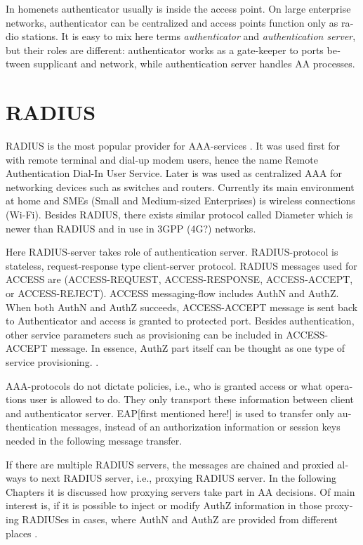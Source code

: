 \documentclass[12pt,a4paper,english]{tutthesis}
\begin{document}
\begin{otherlanguage}{english}
In homenets authenticator usually is inside the access point.
On large enterprise networks, authenticator can be centralized 
and access points function only as radio stations.
It is easy to mix here terms \emph{authenticator} and \emph{authentication
server}, but their roles are different: authenticator works as a
gate-keeper to ports between supplicant and network, while
authentication server handles AA processes.

\section{RADIUS}
\label{sec-2-2}
\label{sec:radius}
RADIUS is the most popular provider for
AAA-services \cite[p.75]{radius-popular}.  It was used first for
with remote terminal and dial-up modem users, hence the name Remote
Authentication Dial-In User Service. Later is was used as centralized AAA
for networking devices such as switches and routers.  Currently its
main environment at home and SMEs (Small and Medium-sized Enterprises) is
wireless connections (Wi-Fi).  Besides RADIUS, there exists similar protocol
called Diameter which is newer than RADIUS and in use in 3GPP (4G?)
networks. 

Here RADIUS-server takes role of authentication server.
RADIUS-protocol is stateless, request-response type client-server
protocol.  RADIUS messages used for ACCESS are (ACCESS-REQUEST,
ACCESS-RESPONSE, ACCESS-ACCEPT, or ACCESS-REJECT). ACCESS
messaging-flow includes AuthN and AuthZ. When both AuthN and AuthZ
succeeds, ACCESS-ACCEPT message is sent back to Authenticator and
access is granted to protected port.  Besides authentication, other
service parameters such as provisioning can be included in
ACCESS-ACCEPT message. In essence, AuthZ part itself can be thought as
one type of service provisioning. \cite{rfc5608}.




AAA-protocols do not dictate policies, i.e., who is granted access or
what operations user is allowed to do. They only transport these information
between client and authenticator server.
EAP[first mentioned here!] is used to transfer only authentication
messages, instead of an authorization information or session keys needed
in the following message transfer. 

If there are multiple RADIUS servers, the messages are chained and
proxied always to next RADIUS server, i.e.,   proxying RADIUS server.
In the following Chapters it is discussed how proxying servers take 
part in AA decisions. Of main interest is, if it is possible 
to inject or modify AuthZ information in those proxying RADIUSes in cases, 
where AuthN and AuthZ are provided from different
places \cite{rfc2607}.



\end{otherlanguage}
\end{document}
